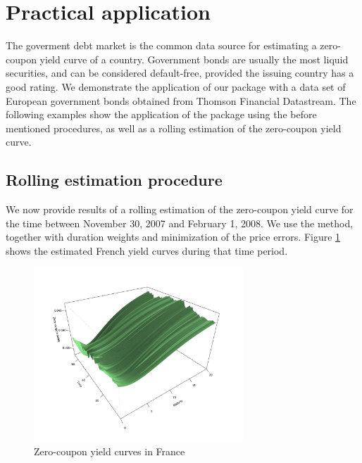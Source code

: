 \section{Practical application}
\label{sec:pract-appl}

The goverment debt market is the common data source for estimating a zero-coupon yield curve of a country. Government bonds are usually the most liquid securities, and can be considered default-free, provided the issuing country has a good rating. We demonstrate the application of our package with a data set of European government bonds obtained from Thomson Financial Datastream. The following examples show the application of the package using the before mentioned procedures, as well as a rolling estimation of the zero-coupon yield curve.




\subsection{Rolling estimation procedure}

We now provide results of a rolling estimation of the zero-coupon yield curve for the time between November 30, 2007 and February 1, 2008. We use the \cite{Svensson1994} method, together with duration weights and minimization of the price errors. Figure \ref{fig:3dplot} shows the estimated French yield curves during that time period.

\begin{figure}[htb]
  \begin{center}
  \caption{Zero-coupon yield curves in France}
  \label{fig:3dplot}
\includegraphics[width=0.7\textwidth]{3dplot}
\end{center}
\end{figure}

